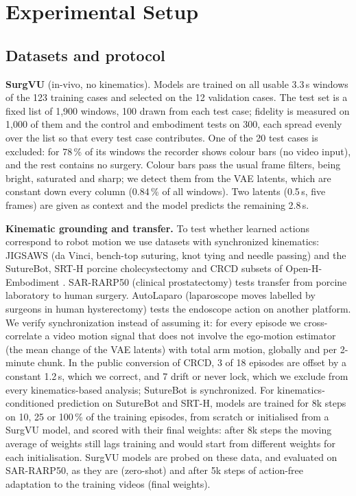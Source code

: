 \section{Experimental Setup}\label{sec:setup}
\subsection{Datasets and protocol}
\textbf{SurgVU} (in-vivo, no kinematics). Models are trained on all usable 3.3\,s windows of the 123 training cases and selected on the 12 validation cases. The test set is a fixed list of 1,900 windows, 100 drawn from each test case; fidelity is measured on 1,000 of them and the control and embodiment tests on 300, each spread evenly over the list so that every test case contributes. One of the 20 test cases is excluded: for 78\,\% of its windows the recorder shows colour bars (no video input), and the rest contains no surgery. Colour bars pass the usual frame filters, being bright, saturated and sharp; we detect them from the VAE latents, which are constant down every column (0.84\,\% of all windows). Two latents (0.5\,s, five frames) are given as context and the model predicts the remaining 2.8\,s.

\textbf{Kinematic grounding and transfer.} To test whether learned actions correspond to robot motion we use datasets with synchronized kinematics: JIGSAWS \cite{jigsaws} (da Vinci, bench-top suturing, knot tying and needle passing) and the SutureBot, SRT-H porcine cholecystectomy and CRCD subsets of Open-H-Embodiment \cite{openh}. SAR-RARP50 \cite{sarrarp} (clinical prostatectomy) tests transfer from porcine laboratory to human surgery. AutoLaparo \cite{autolaparo} (laparoscope moves labelled by surgeons in human hysterectomy) tests the endoscope action on another platform. We verify synchronization instead of assuming it: for every episode we cross-correlate a video motion signal that does not involve the ego-motion estimator (the mean change of the VAE latents) with total arm motion, globally and per 2-minute chunk. In the public conversion of CRCD, 3 of 18 episodes are offset by a constant 1.2\,s, which we correct, and 7 drift or never lock, which we exclude from every kinematics-based analysis; SutureBot is synchronized. For kinematics-conditioned prediction on SutureBot and SRT-H, models are trained for 8k steps on 10, 25 or 100\,\% of the training episodes, from scratch or initialised from a SurgVU model, and scored with their final weights: after 8k steps the moving average of weights still lags training and would start from different weights for each initialisation. SurgVU models are probed on these data, and evaluated on SAR-RARP50, as they are (zero-shot) and after 5k steps of action-free adaptation to the training videos (final weights).

